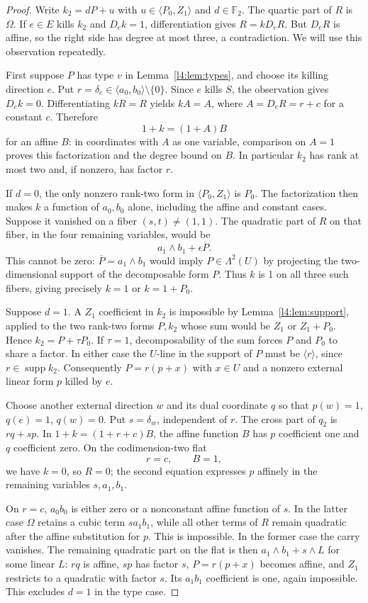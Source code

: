 \documentclass[11pt,a4paper]{article}
\theoremstyle{plain}
\theoremstyle{remark}
\newcommand{\F}{\mathbb F_2}
\newcommand{\supp}{\operatorname{supp}}
\begin{document}
\begin{proof}
Write $k_2=dP+u$ with $u\in\langle P_0,Z_1\rangle$ and $d\in\F$. The quartic part of $R$ is $\Omega$. If $e\in E$ kills $k_2$ and $D_ek=1$, differentiation gives $R=kD_eR$. But $D_eR$ is affine, so the right side has degree at most three, a contradiction. We will use this observation repeatedly.

First suppose $P$ has type $v$ in Lemma~\ref{l4:lem:types}, and choose its killing direction $e$. Put $r=\delta_e\in\langle a_0,b_0\rangle\setminus\{0\}$. Since $e$ kills $S$, the observation gives $D_ek=0$. Differentiating $kR=R$ yields $kA=A$, where $A=D_eR=r+c$ for a constant $c$. Therefore
\[
1+k=(1+A)B
\]
for an affine $B$: in coordinates with $A$ as one variable, comparison on $A=1$ proves this factorization and the degree bound on $B$. In particular $k_2$ has rank at most two and, if nonzero, has factor $r$.

If $d=0$, the only nonzero rank-two form in $\langle P_0,Z_1\rangle$ is $P_0$. The factorization then makes $k$ a function of $a_0,b_0$ alone, including the affine and constant cases. Suppose it vanished on a fiber $(s,t)\ne(1,1)$. The quadratic part of $R$ on that fiber, in the four remaining variables, would be
\[
a_1\wedge b_1+\epsilon\overline P.
\]
This cannot be zero: $\overline P=a_1\wedge b_1$ would imply $P\in\Lambda^2(U)$ by projecting the two-dimensional support of the decomposable form $P$. Thus $k$ is 1 on all three such fibers, giving precisely $k=1$ or $k=1+P_0$.

Suppose $d=1$. A $Z_1$ coefficient in $k_2$ is impossible by Lemma~\ref{l4:lem:support}, applied to the two rank-two forms $P,k_2$ whose sum would be $Z_1$ or $Z_1+P_0$. Hence $k_2=P+\tau P_0$. If $\tau=1$, decomposability of the sum forces $P$ and $P_0$ to share a factor. In either case the $U$-line in the support of $P$ must be $\langle r\rangle$, since $r\in\supp k_2$. Consequently $P=r(p+x)$ with $x\in U$ and a nonzero external linear form $p$ killed by $e$.

Choose another external direction $w$ and its dual coordinate $q$ so that $p(w)=1$, $q(e)=1$, $q(w)=0$. Put $s=\delta_w$, independent of $r$. The cross part of $q_2$ is $rq+sp$. In $1+k=(1+r+c)B$, the affine function $B$ has $p$ coefficient one and $q$ coefficient zero. On the codimension-two flat
\[
r=c,\qquad B=1,
\]
we have $k=0$, so $R=0$; the second equation expresses $p$ affinely in the remaining variables $s,a_1,b_1$.

On $r=c$, $a_0b_0$ is either zero or a nonconstant affine function of $s$. In the latter case $\Omega$ retains a cubic term $sa_1b_1$, while all other terms of $R$ remain quadratic after the affine substitution for $p$. This is impossible. In the former case the carry vanishes. The remaining quadratic part on the flat is then $a_1\wedge b_1+s\wedge L$ for some linear $L$: $rq$ is affine, $sp$ has factor $s$, $P=r(p+x)$ becomes affine, and $Z_1$ restricts to a quadratic with factor $s$. Its $a_1b_1$ coefficient is one, again impossible. This excludes $d=1$ in the type case.


\end{proof}
\end{document}
